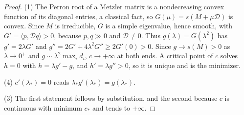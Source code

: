 \begin{proof}
(1) The Perron root of a Metzler matrix is a nondecreasing convex function of its diagonal entries, a classical fact, so $G(\mu)=s(M+\mu\mathcal D)$ is convex. Since $M$ is irreducible, $G$ is a simple eigenvalue, hence
smooth, with $G'=\langle p,\mathcal Dq\rangle>0$, because $p,q\gg0$ and $\mathcal D\ne0$. Thus $g(\lambda)=G(\lambda^2)$ has $g'=2\lambda G'$ and $g''=2G'+4\lambda^2G''\ge2G'(0)>0$. Since $g\to s(M)>0$ as $\lambda\to0^+$ and
$g\sim\lambda^2\max_id_i$, $c\to+\infty$ at both ends. A critical point of $c$ solves $h=0$ with $h=\lambda g'-g$, and $h'=\lambda g''>0$, so it is unique and is the minimizer.

(4) $c'(\lambda_*)=0$ reads $\lambda_*g'(\lambda_*)=g(\lambda_*)$.

(3) The first statement follows by substitution, and the second because $c$ is continuous with minimum $c_*$ and tends to $+\infty$.


\end{proof}
